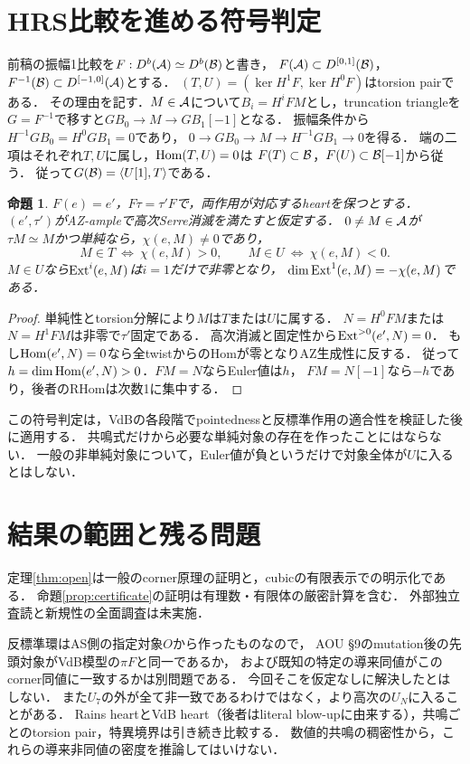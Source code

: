 \documentclass[11pt,a4paper]{ltjsarticle}
\newtheorem{proposition}[theorem]{命題}
\theoremstyle{definition}\newtheorem{remark}[theorem]{注意}
\begin{document}
\section{HRS比較を進める符号判定}
前稿の振幅1比較を$F:D^b(\mathcal A)\simeq D^b(\mathcal B)$と書き，
$F(\mathcal A)\subset D^{[0,1]}(\mathcal B)$，$F^{-1}(\mathcal B)\subset D^{[-1,0]}(\mathcal A)$とする．
$(T,U)=(\ker H^1F,\ker H^0F)$はtorsion pairである．
その理由を記す．$M\in\mathcal A$について$B_i=H^iFM$とし，truncation triangleを
$G=F^{-1}$で移すと$GB_0\to M\to GB_1[-1]$となる．
振幅条件から$H^{-1}GB_0=H^0GB_1=0$であり，
$0\to GB_0\to M\to H^{-1}GB_1\to0$を得る．
端の二項はそれぞれ$T,U$に属し，$\operatorname{Hom}(T,U)=0$は
$F(T)\subset\mathcal B$，$F(U)\subset\mathcal B[-1]$から従う．
従って$G(\mathcal B)=\langle U[1],T\rangle$である．
\begin{proposition}\label{prop:sign}
$F(e)=e'$，$F\tau=\tau'F$で，両作用が対応するheartを保つとする．
$(e',\tau')$がAZ-ampleで高次Serre消滅を満たすと仮定する．
$0\ne M\in\mathcal A$が$\tau M\simeq M$かつ単純なら，$\chi(e,M)\ne0$であり，
\[
 M\in T\ \Longleftrightarrow\ \chi(e,M)>0,\qquad
 M\in U\ \Longleftrightarrow\ \chi(e,M)<0.
\]
$M\in U$なら$\operatorname{Ext}^i(e,M)$は$i=1$だけで非零となり，
$\dim\operatorname{Ext}^1(e,M)=-\chi(e,M)$である．
\end{proposition}
\begin{proof}
単純性とtorsion分解により$M$は$T$または$U$に属する．
$N=H^0FM$または$N=H^1FM$は非零で$\tau'$固定である．
高次消滅と固定性から$\operatorname{Ext}^{>0}(e',N)=0$．
もし$\operatorname{Hom}(e',N)=0$なら全twistからのHomが零となりAZ生成性に反する．
従って$h=\dim\operatorname{Hom}(e',N)>0$．$FM=N$ならEuler値は$h$，
$FM=N[-1]$なら$-h$であり，後者のRHomは次数1に集中する．
\end{proof}
この符号判定は，VdBの各段階でpointednessと反標準作用の適合性を検証した後に適用する．
共鳴式だけから必要な単純対象の存在を作ったことにはならない．
一般の非単純対象について，Euler値が負というだけで対象全体が$U$に入るとはしない．

\section{結果の範囲と残る問題}
定理\ref{thm:open}は一般のcorner原理の証明と，cubicの有限表示での明示化である．
命題\ref{prop:certificate}の証明は有理数・有限体の厳密計算を含む．
外部独立査読と新規性の全面調査は未実施．

反標準環はAS側の指定対象$O$から作ったものなので，
AOU \S9のmutation後の先頭対象がVdB模型の$\pi F$と同一であるか，
および既知の特定の導来同値がこのcorner同値に一致するかは別問題である．
今回そこを仮定なしに解決したとはしない．
また$U_7$の外が全て非一致であるわけではなく，より高次の$U_N$に入ることがある．
Rains heartとVdB heart（後者はliteral blow-upに由来する），共鳴ごとのtorsion pair，特異境界は引き続き比較する．
数値的共鳴の稠密性から，これらの導来非同値の密度を推論してはいけない．
\end{document}
